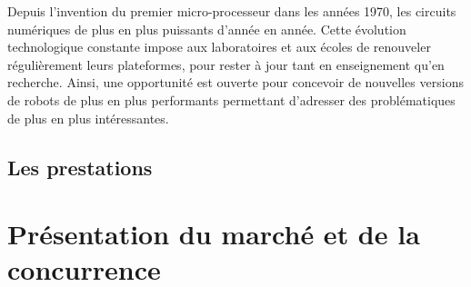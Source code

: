 \documentclass[a4paper,12pt]{report}
\begin{document}
Depuis l'invention du premier micro-processeur dans les années 1970, les circuits numériques de plus en plus puissants d'année en année.
Cette évolution technologique constante impose aux laboratoires et aux écoles de renouveler régulièrement leurs plateformes, pour rester à jour tant en enseignement qu'en recherche.
Ainsi, une opportunité est ouverte pour concevoir de nouvelles versions de robots de plus en plus performants permettant d'adresser des problématiques de plus en plus intéressantes.\\


\subsection{Les prestations}

\section{Présentation du marché et de la concurrence}

\end{document}
